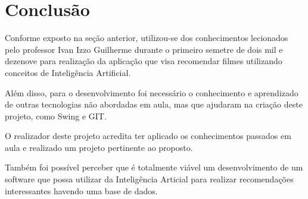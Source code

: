 \chapter{Conclusão}\label{cap_conclu}

 Conforme exposto na seção anterior, utilizou-se dos conhecimentos lecionados pelo professor Ivan Izzo Guilherme durante o primeiro semetre de dois mil e dezenove para realização da aplicação que visa recomendar filmes utilizando conceitos de Inteligência Artificial.

 Além disso, para o desenvolvimento foi necessário o conhecimento e aprendizado de outras tecnologias não abordadas em aula, mas que ajudaram na criação deste projeto, como Swing e GIT.

 O realizador deste projeto acredita ter aplicado os conhecimentos passados em aula e realizado um projeto pertinente ao proposto.

Também foi possível perceber que é totalmente viável um desenvolvimento de um software que possa utilizar da Inteligência Articial para realizar recomendações interessantes havendo uma base de dados.